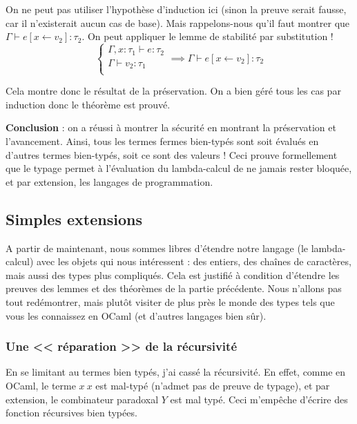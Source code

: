 \documentclass[11pt]{article}
\begin{document}
\begin{itemize}
    On ne peut pas utiliser l'hypothèse d'induction ici (sinon la preuve serait fausse, car il n'existerait aucun cas de base). Mais rappelons-nous qu'il faut montrer que $\Gamma\vdash e\left[x\leftarrow v_2\right]:\tau_2$. On peut appliquer le lemme de stabilité par substitution !
    $$
    \begin{cases}
        \Gamma, x:\tau_1\vdash e:\tau_2\\
        \Gamma \vdash v_2:\tau_1\\
    \end{cases}\implies \Gamma\vdash e[x\leftarrow v_2]: \tau_2$$

    Cela montre donc le résultat de la préservation. On a bien géré tous les cas par induction donc le théorème est prouvé.
\end{itemize}

\textbf{Conclusion} : on a réussi à montrer la sécurité en montrant la préservation et l'avancement. Ainsi, tous les termes fermes bien-typés sont soit évalués en d'autres termes bien-typés, soit ce sont des valeurs ! Ceci prouve formellement que le typage permet à l'évaluation du lambda-calcul de ne jamais rester bloquée, et par extension, les langages de programmation. 

\subsection{Simples extensions}

A partir de maintenant, nous sommes libres d'étendre notre langage (le lambda-calcul) avec les objets qui nous intéressent : des entiers, des chaînes de caractères, mais aussi des types plus compliqués. Cela est justifié à condition d'étendre les preuves des lemmes et des théorèmes de la partie précédente. Nous n'allons pas tout redémontrer, mais plutôt visiter de plus près le monde des types tels que vous les connaissez en OCaml (et d'autres langages bien sûr).

\subsubsection{Une << réparation >> de la récursivité}

En se limitant au termes bien typés, j'ai cassé la récursivité. En effet, comme en OCaml, le terme $x~x$ est mal-typé (n'admet pas de preuve de typage), et par extension, le combinateur paradoxal $Y$ est mal typé. Ceci m'empêche d'écrire des fonction récursives bien typées.
\end{document}
